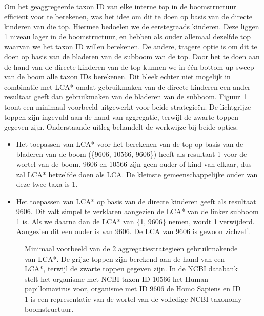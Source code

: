 Om het geaggregeerde taxon ID van elke interne top in de boomstructuur efficiënt voor te berekenen, was het idee om dit te doen op basis van de directe kinderen van die top.
Hiermee bedoelen we de eerstegraads kinderen.
Deze liggen 1 niveau lager in de boomstructuur, en hebben als ouder allemaal dezelfde top waarvan we het taxon ID willen berekenen.
De andere, tragere optie is om dit te doen op basis van de bladeren van de subboom van de top.
Door het te doen aan de hand van de directe kinderen van de top kunnen we in één bottom-up sweep van de boom alle taxon IDs berekenen.
Dit bleek echter niet mogelijk in combinatie met LCA* omdat gebruikmaken van de directe kinderen een ander resultaat geeft dan gebruikmaken van de bladeren van de subboom.
Figuur~\ref{fig:lca*_diff} toont een minimaal voorbeeld uitgewerkt voor beide strategieën.
De lichtgrijze toppen zijn ingevuld aan de hand van aggregatie, terwijl de zwarte toppen gegeven zijn.
Onderstaande uitleg behandelt de werkwijze bij beide opties.
\begin{itemize}
    \item Het toepassen van LCA* voor het berekenen van de top op basis van de bladeren van de boom (\{9606, 10566, 9606\}) heeft als resultaat 1 voor de wortel van de boom.
    9606 en 10566 zijn geen ouder of kind van elkaar, dus zal LCA* hetzelfde doen als LCA\@.
    De kleinste gemeenschappelijke ouder van deze twee taxa is 1.
    \item Het toepassen van LCA* op basis van de directe kinderen geeft als resultaat 9606.
    Dit valt simpel te verklaren aangezien de LCA* van de linker subboom 1 is.
    Als we daarna dan de LCA* van \{1, 9606\} nemen, wordt 1 verwijderd.
    Aangezien dit een ouder is van 9606.
    De LCA van 9606 is gewoon zichzelf.
\end{itemize}

\begin{figure}[ht]
    \centering
    \hspace{0.25\textwidth}%
    \caption{Minimaal voorbeeld van de 2 aggregatiestrategieën gebruikmakende van LCA*. De grijze toppen zijn berekend aan de hand van een LCA*, terwijl de zwarte toppen gegeven zijn. In de NCBI databank stelt het organisme met NCBI taxon ID 10566 het Human papillomavirus voor, organisme met ID 9606 de Homo Sapiens en ID 1 is een representatie van de wortel van de volledige NCBI taxonomy boomstructuur.}\label{fig:lca*_diff}
\end{figure}

